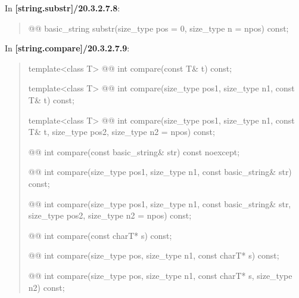 \documentclass{wg21}
\begin{document}
In \textbf{[string.substr]/20.3.2.7.8}:
\begin{quote}
\begin{itemdecl}
@@ basic_string substr(size_type pos = 0, size_type n = npos) const;
\end{itemdecl}
\end{quote}

In \textbf{[string.compare]/20.3.2.7.9}:
\begin{quote}
\begin{itemdecl}
template<class T>
  @@
  int compare(const T& t) const;
\end{itemdecl}

\begin{itemdecl}
template<class T>
  @@
  int compare(size_type pos1, size_type n1, const T& t) const;
\end{itemdecl}

\begin{itemdecl}
template<class T>
  @@
  int compare(size_type pos1, size_type n1, const T& t, size_type pos2, size_type n2 = npos) const;
\end{itemdecl}

\begin{itemdecl}
@@ int compare(const basic_string& str) const noexcept;
\end{itemdecl}

\begin{itemdecl}
@@ int compare(size_type pos1, size_type n1, const basic_string& str) const;
\end{itemdecl}

\begin{itemdecl}
@@
int compare(size_type pos1, size_type n1, const basic_string& str,
            size_type pos2, size_type n2 = npos) const;
\end{itemdecl}

\begin{itemdecl}
@@ int compare(const charT* s) const;
\end{itemdecl}

\begin{itemdecl}
@@ int compare(size_type pos, size_type n1, const charT* s) const;
\end{itemdecl}

\begin{itemdecl}
@@ int compare(size_type pos, size_type n1, const charT* s, size_type n2) const;
\end{itemdecl}
\end{quote}
\end{document}
